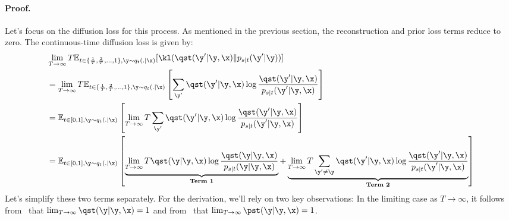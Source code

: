 \documentclass{article} %
\begin{document}
{\begin{appendices}
\paragraph{Proof.} Let’s focus on the diffusion loss for this process. As mentioned in the previous section, the reconstruction and prior loss terms reduce to zero. The continuous-time diffusion loss is given by:
\begin{align}\label{eqn:sedd_nelbo_partial}
    & \lim_{T \to \infty} T  \mathbb{E}_{t \in \{\frac{1}{T}, \frac{2}{T}, \ldots, 1\}, \y \sim q_t(. | \x)} [\kl (\qst(\y' | \y, \x) \| p_{s|t}(\y' | \y))] \nonumber \\
    & = \lim_{T \to \infty} T  \mathbb{E}_{t \in \{\frac{1}{T}, \frac{2}{T}, \ldots, 1\}, \y \sim q_t(. | \x)} \left[\sum_{\y'} \qst(\y' | \y, \x) \log \frac{\qst(\y' | \y, \x)}{p_{s|t}(\y' | \y, \x)} \right] \nonumber \\
    & = \mathbb{E}_{t \in [0, 1], \y \sim q_t(. | \x)} \left[\lim_{T \to \infty} T \sum_{\y'} \qst(\y' | \y, \x) \log \frac{\qst(\y' | \y, \x)}{p_{s|t}(\y' | \y, \x)} \right] \nonumber \\
    & = \mathbb{E}_{t \in [0, 1], \y \sim q_t(. | \x)} \left[
        \underbrace{\lim_{T \to \infty} T \qst(\y | \y, \x) \log \frac{\qst(\y | \y, \x)}{p_{s|t}(\y | \y, \x)}}_{\textbf{Term 1}} + 
        \underbrace{\lim_{T \to \infty} T \sum_{\y' \neq \y} \qst(\y' | \y, \x) \log \frac{\qst(\y' | \y, \x)}{p_{s|t}(\y' | \y, \x)}}_{\textbf{Term 2}} \right]
\end{align}
Let's simplify these two terms separately. For the derivation, we'll rely on two key observations: In the limiting case as $T \to \infty$, it follows from~ that $\lim_{T \to \infty} \qst(\y | \y, \x) = 1$ and from~ that $\lim_{T \to \infty} \pst(\y | \y, \x) = 1$.

\end{appendices}}
\end{document}
